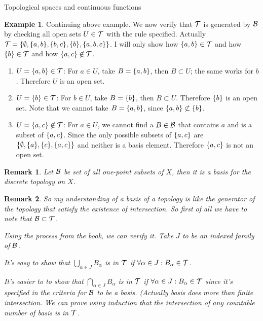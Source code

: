 \documentclass{report}
\newtheorem*{remark}{Remark}
\theoremstyle{definition}
\newtheorem{example}[theorem]{Example}
\newcommand{\set}[1]{\ensuremath\{#1\}}
\begin{document}
\begin{chapter}{Topological spaces and continuous functions}
  \begin{example}
    Continuing above example. We now verify that $\mathcal{T}$ is generated by
    $\mathcal{B}$ by checking all open sets $U\in\mathcal{T}$ with the rule specified.
    Actually \\
    ${\T=\set{\emptyset, \set{a,b}, \set{b,c}, \set{b},
        \set{a,b,c}}}$. I will only show how $\set{a,b}\in\T$ and how
    $\set{b}\in\T$ and how $\set{a,c}\not\in\T$.

    \begin{enumerate}
    \item $U=\set{a,b}\in\T$: For $a\in U$, take $B=\set{a,b}$, then
      $B\subset U$; the same works for $b$. Therefore $U$ is an open
      set.
    \item $U=\set{b}\in\T$: For $b\in U$, take $B=\set{b}$, then
      $B\subset U$. Therefore $\set{b}$ is an open set. Note that we
      cannot take $B=\set{a,b}$, since $\set{a,b}\not\subset \set{b}$.
    \item $U=\set{a,c}\not\in\T$: For $a\in U$, we cannot find a
      $B\in\mathcal{B}$ that contains $a$ and is a subset of $\set{a,c}$. Since
      the only possible subsets of $\set{a,c}$ are $\set{\emptyset,
        \set{a}, \set{c}, \set{a,c}}$ and neither is a basis
      element. Therefore $\set{a,c}$ is not an open set.
    \end{enumerate}
  \end{example}
  \begin{remark}
    Let $\mathcal{B}$ be set of all one-point subsets of $X$, then it is a
    basis for the discrete topology on $X$.
  \end{remark}
  \begin{remark}
    So my understanding of a basis of a topology is like the generator
    of the topology that satisfy the existence of intersection. So
    first of all we have to note that $\mathcal{B}\subset\mathcal{T}$.

    Using the process from the book, we can verify it. Take $J$ to be
    an indexed family of $\mathcal{B}$.

    It's easy to show that $\bigcup_{\alpha\in J} B_\alpha$ is in $\mathcal{T}$
    if $\forall \alpha\in J : B_\alpha\in\mathcal{T}$.

    It's easier to to show that $\bigcap_{\alpha\in J} B_\alpha$ is in
    $\mathcal{T}$ if $\forall \alpha\in J: B_\alpha\in\mathcal{T}$ since it's specified
    in the criteria for $\mathcal{B}$ to be a basis. (Actually basis does more
    than finite intersection. We can prove using induction that the
    intersection of any countable number of basis is in $\mathcal{T}$.


\end{remark}
\end{chapter}
\end{document}
